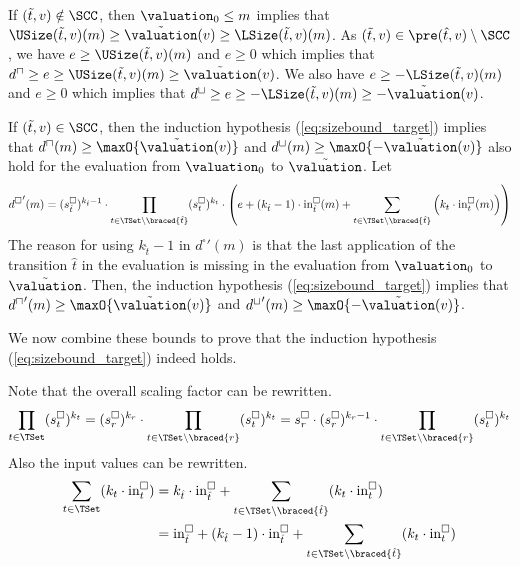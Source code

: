 If $(\tilde{t}, v) \notin \SCC$, then $\valuation_0 \leq m$ implies that $\USize(\tilde{t}, v)(m) \geq \tilde{\valuation}(v) \geq \LSize(\tilde{t}, v)(m)$.
As $(\tilde{t}, v) \in \pre(\hat{t}, v) \setminus \SCC$, we have $e \geq \USize(\tilde{t}, v)(m)$ and $e \geq 0$ which implies that $d^\sqcap \geq e \geq \USize(\tilde{t}, v)(m) \geq \tilde{\valuation}(v)$.
We also have $e \geq -\LSize(\tilde{t}, v)(m)$ and $e \geq 0$ which implies that $d^\sqcup \geq e \geq -\LSize(\tilde{t}, v)(m) \geq -\tilde{\valuation}(v)$.

If $(\tilde{t}, v) \in \SCC$, then the induction hypothesis (\ref{eq:sizebound_target}) implies that $d^\sqcap(m) \geq \maxO{\tilde{\valuation}(v)}$ and $d^\sqcup(m) \geq \maxO{-\tilde{\valuation}(v)}$ also hold for the evaluation from $\valuation_0$ to $\tilde{\valuation}$.
Let
\begin{equation} \label{eq:induction_consequence}
  {d^\square}'(m) = (s^\square_{\hat{t}})^{k_{\hat{t}} - 1} \cdot \prod_{t \in \TSet \setminus \braced{\hat{t}}} (s^\square_t)^{k_t} \cdot \left( e + \left( k_{\hat{t}} - 1 \right) \cdot \text{in}^\square_{\hat{t}}(m) + \sum_{t \in \TSet \setminus \braced{\hat{t}}} \left( k_t \cdot \text{in}^\square_t(m) \right) \right)
\end{equation}
The reason for using $k_{\hat{t}} - 1$ in ${d^\square}'(m)$ is that the last application of the transition $\hat{t}$ in the evaluation is missing in the evaluation from $\valuation_0$ to $\tilde{\valuation}$.
Then, the induction hypothesis (\ref{eq:sizebound_target}) implies that ${d^\sqcap}'(m) \geq \maxO{\tilde{\valuation}(v)}$ and ${d^\sqcup}'(m) \geq \maxO{-\tilde{\valuation}(v)}$.

We now combine these bounds to prove that the induction hypothesis (\ref{eq:sizebound_target}) indeed holds.

Note that the overall scaling factor can be rewritten.
\begin{equation} \label{eq:scaling_factor_reduction}
  \prod_{t \in \TSet} (s^\square_t)^{k_t} = (s^\square_r)^{k_r} \cdot \prod_{t \in \TSet \setminus \braced{r}} (s^\square_t)^{k_t} = s^\square_r \cdot (s^\square_r)^{k_r - 1} \cdot \prod_{t \in \TSet \setminus \braced{r}} (s^\square_t)^{k_t}
\end{equation}
Also the input values can be rewritten.
\begin{equation} \label{eq:input_reduction}
  \begin{split}
  \sum_{t \in \TSet} (k_t \cdot \text{in}^\square_t)
  & = k_{\hat{t}} \cdot \text{in}^\square_{\hat{t}} + \sum_{t \in \TSet \setminus \braced{\hat{t}}} (k_t \cdot \text{in}^\square_t) \\
  & = \text{in}^\square_{\hat{t}}
    + (k_{\hat{t}} - 1) \cdot \text{in}^\square_{\hat{t}}
    + \sum_{t \in \TSet \setminus \braced{\hat{t}}} (k_t \cdot \text{in}^\square_t)
  \end{split}
\end{equation}

